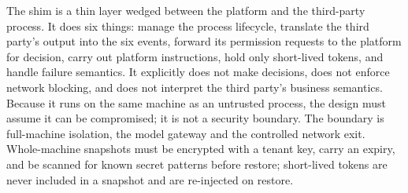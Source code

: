 The shim is a thin layer wedged between the platform and the third-party process. It does six things: manage the process lifecycle, translate the third party's output into the six events, forward its permission requests to the platform for decision, carry out platform instructions, hold only short-lived tokens, and handle failure semantics. It explicitly does not make decisions, does not enforce network blocking, and does not interpret the third party's business semantics. Because it runs on the same machine as an untrusted process, the design must assume it can be compromised; it is not a security boundary. The boundary is full-machine isolation, the model gateway and the controlled network exit. Whole-machine snapshots must be encrypted with a tenant key, carry an expiry, and be scanned for known secret patterns before restore; short-lived tokens are never included in a snapshot and are re-injected on restore.
